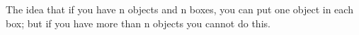 The idea that if you have n objects and n 
boxes, you can put one object in each box; 
but if you have more than n objects you cannot 
do this.